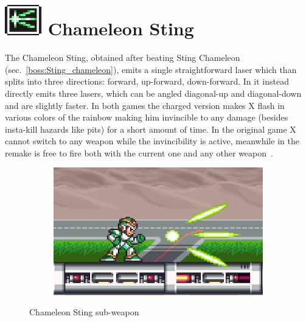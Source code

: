 \section{\includegraphics[scale=0.2]{figures/X1/weapons/C_sting.jpg} Chameleon Sting}\label{Chameleon_sting}
The Chameleon Sting, obtained after beating Sting Chameleon (sec.~\ref{boss:Sting_chameleon}), emits a single straightforward laser which than splits into three directions: forward, up-forward, down-forward. In \mhx it instead directly emits three lasers, which can be angled diagonal-up and diagonal-down and are slightly faster. In both games the charged version makes X flash in various colors of the rainbow making him invincible to any damage (besides insta-kill hazards like pits) for a short amount of time. In the original game X cannot switch to any weapon while the invincibility is active, meanwhile in the remake is free to fire both with the current one and any other weapon~\cite{wiki:Chameleon_sting}.
\begin{figure}[htp]
	\centering
	\begin{subfigure}{0.35\linewidth}
		\includegraphics[width=\linewidth]{figures/X1/weapons/Chameleon_sting.jpg}
	\end{subfigure}
	\caption{Chameleon Sting sub-weapon}
\end{figure}

